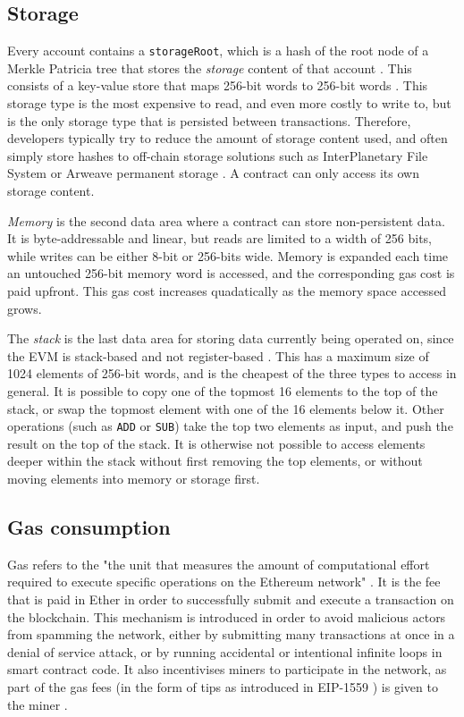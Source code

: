 \subsection{Storage}
\label{section:storage}
Every account contains a \texttt{storageRoot}, which is a hash of the root node of a Merkle
Patricia tree that stores the \textit{storage} content of that account \cite{ethereumyellowpaper}.
This consists of a key-value store that maps 256-bit words to 256-bit words \cite{solidityevm}.
This storage type is the most expensive to read, and even more costly to write to, but is the
only storage type that is persisted between transactions. Therefore, developers typically try 
to reduce the amount of storage content used, and often simply store hashes to off-chain storage
solutions such as InterPlanetary File System \cite{ipfs} or Arweave permanent storage \cite{arweave}. A contract
can only access its own storage content.

\textit{Memory} is the second data area where a contract can store non-persistent data. It is
byte-addressable and linear, but reads are limited to a width of 256 bits, while writes
can be either 8-bit or 256-bits wide. \cite{solidityevm} Memory is expanded each time an untouched 256-bit
memory word is accessed, and the corresponding gas cost is paid upfront. This gas cost increases
quadatically as the memory space accessed grows.

The \textit{stack} is the last data area for storing data currently being operated on, since
the EVM is stack-based and not register-based \cite{solidityevm}. This has a maximum
size of 1024 elements of 256-bit words, and is the cheapest of the three types to access in general. 
It is possible to copy one of the topmost 16 elements
to the top of the stack, or swap the topmost element with one of the 16 elements below it.
Other operations (such as \texttt{ADD} or \texttt{SUB}) take the top two elements as input,
and push the result on the top of the stack. It is otherwise not possible to access elements
deeper within the stack without first removing the top elements, or without moving elements
into memory or storage first.

\subsection{Gas consumption}
\label{evm:gas}
Gas refers to the "the unit that measures the amount of computational effort required 
to execute specific operations on the Ethereum network" \cite{ethgas}. It is the fee
that is paid in Ether in order to successfully submit and execute a transaction 
on the blockchain. This mechanism is introduced in order to avoid malicious actors
from spamming the network, either by submitting many transactions at once in a denial
of service attack, or by running accidental or intentional infinite loops in smart
contract code. It also incentivises miners to participate in the network, as part of
the gas fees (in the form of tips as introduced in EIP-1559 \cite{eip1559}) is given to the miner .

